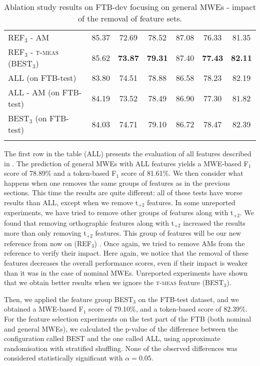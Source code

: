 \documentclass[output=paper,
modfonts
]{langscibook}
\begin{document}
\begin{table*}
\begin{tabular}{l@{~~~}c@{~~~}c@{~~~}c@{~~~~~~~~}c@{~~~}c@{~~~}c}
\textsc{REF$_3$} - \textsc{AM}  & 85.37  & 72.69  & 78.52  & 87.08  & 76.33  & 81.35  \\ %
\textsc{REF$_3$} - \textsc{t-meas} (\textsc{BEST$_3$}) & 85.62 & \textbf{73.87} & \textbf{79.31} & 87.40 & \textbf{77.43} & \textbf{82.11} \\ %
\lspbottomrule
\textsc{ALL} (on FTB-test) & 83.80 & 74.51 & 78.88 & 86.58 & 78.23 & 82.19 \\ 
\textsc{ALL - \textsc{AM}} (on FTB-test) & 84.19 & 73.52 & 78.49 & 86.90 & 77.30 & 81.82 \\ 
\textsc{BEST$_3$} (on FTB-test) & 84.03 & 74.71 & 79.10 & 86.72 & 78.47 & 82.39 \\ 
\lspbottomrule
\end{tabular}
\caption{Ablation study results on FTB-dev focusing on general MWEs - impact of the removal of feature sets.}
\label{tab:ftbAllMWEsCoarse}
\end{table*}

The first row in the table (ALL) presents the evaluation of all features described in . The prediction of general MWEs with ALL features yields a MWE-based F$_1$ score of 78.89\% and a token-based F$_1$ score of 81.61\%.
We then consider what happens when one removes the same groups of features as in the previous sections. This time the results are quite different: all of these tests have worse results than ALL, except when we remove t$_{+2}$ features. In some unreported experiments, we have tried to remove other groups of features along with t$_{+2}$. We found that removing orthographic features along with t$_{+2}$ increased the results more than only removing t$_{+2}$ features. This group of features will be our new reference from now on (REF$_3$)%
. Once again, we tried to remove AMs from the reference to verify their impact. Here again, we notice that the removal of these features decreases the overall performance scores, even if their impact is weaker than it was in the case of nominal MWEs. 
Unreported experiments have shown that we obtain better results when we ignore the \textsc{t-meas} feature (BEST$_3$). 

Then, we applied the feature group BEST$_3$ on the FTB-test dataset, and we obtained a MWE-based F$_1$ score of 79.10\%, and a token-based score of 82.39\%. 
For the feature selection experiments on the test part of the FTB (both nominal and general MWEs), we calculated the p-value of the difference between the configuration called BEST and the one called ALL, using approximate randomisation with stratified shuffling. None of the observed differences was considered statistically significant with $\alpha=0.05$.
\end{document}

